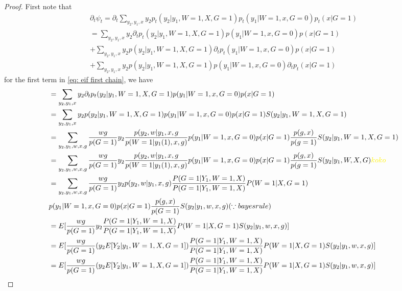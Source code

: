 \documentclass{article}
\begin{document}
\begin{proof}
    First note that 
    \begin{align}
        \partial_t \psi_t = \partial_t \sum_ { y_2, y_1,x} y_2 p_t ( y_2| y_1 , W= 1, X , G= 1) p_t ( y_1 | W =1 , x, G= 0 ) p_t( x | G =1 )   \\
        = \label{eq: eif first chain} \sum_ { y_2 ,y_1,x} y_2 \partial_t p_t ( y_2| y_1 , W= 1, X , G= 1) p ( y_1 | W =1 , x, G= 0 ) p( x | G =1 )   \\
        + \sum_ { y_2 ,y_1,x} y_2  p ( y_2| y_1 , W= 1, X , G= 1)\partial_t p_t ( y_1 | W =1 , x, G= 0 ) p( x | G =1 ) \\
    + \sum_ { y_2 ,y_1,x} y_2  p ( y_2| y_1 , W= 1, X , G= 1) p ( y_1 | W =1 , x, G= 0 ) \partial_t p_t( x | G =1 )
    \end{align}
    for the first term in  \ref{eq: eif first chain},  we have
\begin{align}
&=\sum_ { y_2 ,y_1,x} y_2 \partial_t p_t ( y_2| y_1 , W= 1, X , G= 1) p ( y_1 | W =1 , x, G= 0 ) p( x | G =1 ) \\
&= \sum_ { y_2 ,y_1,x} y_2 p ( y_2| y_1 , W= 1, X , G= 1) p ( y_1 | W =1 , x, G= 0 ) p( x | G =1 ) S ( y_2| y_1 , W= 1, X , G= 1) \\
&= \sum_ { y_2 ,y_1,w, x, g}  \frac{ w g }{ p (G = 1) } y_2  \frac{ p( y_2, w | y_1, x, g}{ p ( W = 1 | y_1(1) , x , g ) }   p ( y_1 | W =1 , x, G= 0 ) p( x | G =1 ) \frac{ p ( g, x ) } { p(g =1)} S ( y_2| y_1 , W= 1, X , G= 1) \\
&= \sum_ { y_2 ,y_1,w, x, g}  \frac{ w g }{ p (G = 1) } y_2  \frac{ p( y_2, w | y_1, x, g}{ p ( W = 1 | y_1(1) , x , g ) }   p ( y_1 | W =1 , x, G= 0 ) p( x | G =1 ) \frac{ p ( g, x ) } { p(g =1)} S ( y_2| y_1 , W, X , G) \koko \\
&= \sum_ { y_2 ,y_1,w, x, g}  \frac{ w g }{ p (G = 1) } y_2   p( y_2, w | y_1, x, g)  \frac{ P( G =1 | Y_1 , W=1 , X ) }{ P(G=1 | Y_1 , W=1 , X ) } P( W=1 | X , G=1)   \\
&p ( y_1 | W =1 , x, G= 0 ) p( x | G =1 )  
\frac{ p ( g, x ) } { p(G =1)} S ( y_2| y_1 , w, x , g) ( \because bayes rule)\\
&= E [  \frac{ w g }{ p (G = 1) } y_2     \frac{ P( G =1 | Y_1 , W=1 , X ) }{ P(G=1 | Y_1 , W=1 , X ) } P( W=1 | X , G=1)   S ( y_2| y_1 , w, x , g) ]\\
&= E [  \frac{ w g }{ p (G = 1) } ( y_2  E [ Y_2 | y_1 , W = 1, X, G =1 ] )     \frac{ P( G =1 | Y_1 , W=1 , X ) }{ P(G=1 | Y_1 , W=1 , X ) } P( W=1 | X , G=1)   S ( y_2| y_1 , w, x , g) ]\\
&= E [  \frac{ w g }{ p (G = 1) } ( y_2  E [ Y_2 | y_1 , W = 1, X, G =1 ] )     \frac{ P( G =1 | Y_1 , W=1 , X ) }{ P(G=1 | Y_1 , W=1 , X ) } P( W=1 | X , G=1)   S ( y_2| y_1 , w, x , g) ]\\

\end{align}
\end{proof}
\end{document}
